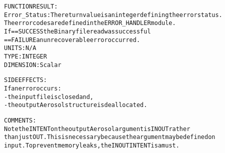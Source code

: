 \begin{alltt}
  FUNCTION RESULT:
        Error_Status:   The return value is an integer defining the error status.
                        The error codes are defined in the ERROR_HANDLER module.
                        If == SUCCESS the Binary file read was successful
                           == FAILURE an unrecoverable error occurred.
                        UNITS:      N/A
                        TYPE:       INTEGER
                        DIMENSION:  Scalar
 
  SIDE EFFECTS:
        If an error occurs:
        - the input file is closed and,
        - the output Aerosol structure is deallocated.
 
  COMMENTS:
        Note the INTENT on the output Aerosol argument is IN OUT rather
        than just OUT. This is necessary because the argument may be defined on
        input. To prevent memory leaks, the IN OUT INTENT is a must.
 
  \end{alltt}
